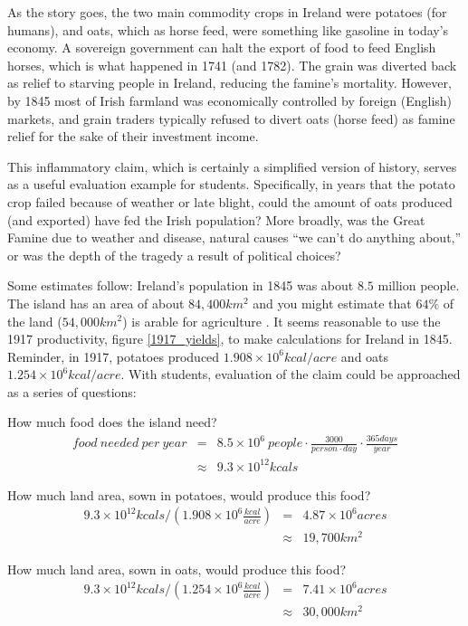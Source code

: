 \documentclass[prb,preprint]{revtex4-2}
\newcommand{\bea}{\begin{eqnarray}}
\newcommand{\eea}{\end{eqnarray}}
\begin{document}
As the story goes, the two main commodity crops in Ireland were potatoes (for humans), and oats, which as horse feed, were something like gasoline in today's economy.  A sovereign government can halt the export of food to feed English horses, which is what happened in 1741 (and 1782). The grain was diverted back as relief to starving people in Ireland, reducing the famine's mortality. However, by 1845 most of Irish farmland was economically controlled by foreign (English) markets, and grain traders typically refused to divert oats (horse feed) as famine relief for the sake of their investment income.

This inflammatory claim, which is certainly a simplified version of history, serves as a useful evaluation example for students. Specifically, in years that the potato crop failed because of weather or late blight, could the amount of oats produced (and exported) have fed the Irish population?  More broadly, was the Great Famine due to weather and disease, natural causes ``we can't do anything about,''  or was the depth of the tragedy a result of political choices?

Some estimates follow:  Ireland's population in 1845 was about $8.5$ million people.  The island has an area of about $84,400km^2$ \cite{IRE_area} and you might estimate that $64\%$ of the land ($54,000km^2$) is arable for agriculture \cite{arable_percentage}.  
It seems reasonable to use the 1917 productivity,  figure \ref{1917_yields},  to make calculations for Ireland in 1845.  Reminder, in 1917, potatoes produced $1.908\times10^6 kcal/acre$ and oats $1.254\times10^6kcal/acre$.
With students, evaluation of the claim could be approached as a series of questions:

How much food does the island need?
\bea
food~needed~per~year &=& 8.5\times10^6~people
	\cdot \frac{3000}{person\cdot day }
	\cdot \frac{365days}{year} \nonumber \\
&\approx& 9.3\times 10^{12} kcals \nonumber
\eea       

How much land area, sown in potatoes, would produce this food?
\bea
9.3\times10^{12}kcals /\left(1.908\times 10^6\frac{kcal}{acre}\right) &=& 4.87\times10^6 acres \nonumber\\
 &\approx& 19,700 km^2 \nonumber
\eea

How much land area, sown in oats, would produce this food?
\bea
9.3\times10^{12}kcals /\left(1.254\times10^6\frac{kcal}{acre}\right) &=& 7.41 \times10^6 acres \nonumber \\
 &\approx& 30,000 km^2 \nonumber
\eea
\end{document}
